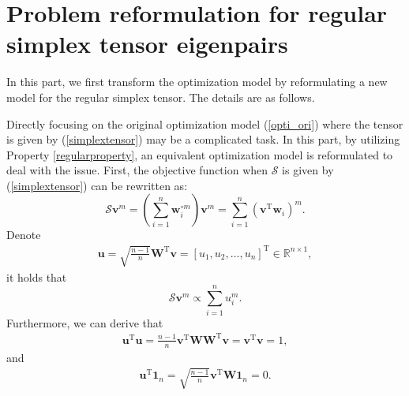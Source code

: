 

\section{Problem  reformulation for   regular simplex  tensor eigenpairs}\label{reformulated}

In  this  part, we   first  transform  the  optimization  model     by  
reformulating  a  new  model  for  the  regular  simplex  tensor.
The  details are as  follows.

 Directly  focusing  on  the  original  optimization model   (\ref{opti_ori}) where  the  tensor  is  given  by  (\ref{simplextensor})
 may be  a  complicated   task.
 In  this  part,  by  utilizing  
 Property  \ref{regularproperty}, 
 an equivalent   optimization  model  is  reformulated  to   deal  with  the  issue. 
 First,  
 the  objective function   when $ \mathcal{S}$ is  given by  (\ref{simplextensor}) can be  rewritten as:
 	\begin{equation}
 \mathcal{S}  \mathbf v^{m}    
  =
 (\sum_{i=1}^{n} \mathbf{w}_{i}^{\circ m} )\mathbf v^{m} 
 =
  \sum_{i=1}^{n} ( \mathbf v^{\mathrm T} \mathbf{w}_{i})^{ m} .
 \end{equation}
 Denote  
 \begin{align}\label{udenote}
 \mathbf   u =
 \sqrt {
 	  \frac  {n-1}{ n}
  }   
 {\mathbf W}^{\mathrm T}  {\mathbf v}  = 
 [u_1,u_2,\dots, u_{n}]^{\mathrm T} \in  \mathbb {R}^{n \times 1} ,
 \end{align} 
 it holds that
 	\begin{equation}
 \mathcal{S}  \mathbf v^{m}    
\varpropto 
\sum\limits_{i=1}^{n}  u_{i}^{m}.
 \end{equation}
Furthermore, 
we  can  derive  that 
  \begin{align}\label{utu}
 \mathbf   u ^{\mathrm T} \mathbf   u
  =
   \frac  {n-1}{  n  }  
   {\mathbf v} ^{\mathrm T} {\mathbf W} {\mathbf W}^{\mathrm T}  {\mathbf v}  
   =
   {\mathbf v} ^{\mathrm T}  {\mathbf v}  
   =1 ,
 \end{align}
 and 
   \begin{align}\label{uln}
 \mathbf   u ^{\mathrm T}
  \mathbf 1_{n}
 =
 \sqrt {
	\frac  {n-1}{ n}
}   
 {\mathbf v} ^{\mathrm T} {\mathbf W}   {\mathbf 1_{n}}  
 = 
0 .
 \end{align}
 
